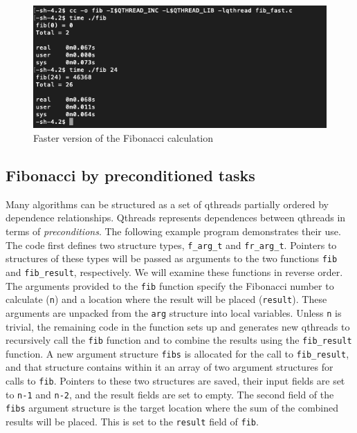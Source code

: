 \documentclass[12pt,fullpage]{article}
\begin{document}
\begin{figure}[h]
\includegraphics[scale=0.90]{fib_fast.png}
\caption{Faster version of the Fibonacci calculation}
\end{figure}

\newpage


\subsection{Fibonacci by preconditioned tasks}

Many algorithms can be structured as a set of qthreads partially ordered by dependence relationships.  Qthreads represents dependences between qthreads in terms of {\it preconditions}.  The following example program demonstrates their use.
\\

The code first defines two structure types, {\tt f\_arg\_t} and {\tt fr\_arg\_t}.  Pointers to structures of these types will be passed as arguments to the two functions {\tt fib} and {\tt fib\_result}, respectively.  We will examine these functions in reverse order.  The arguments provided to the {\tt fib} function specify the Fibonacci number to calculate ({\tt n}) and a location where the result will be placed ({\tt result}).   These arguments are unpacked from the {\tt arg} structure into local variables.  Unless {\tt n} is trivial, the remaining code in the function sets up and generates new qthreads to recursively call the {\tt fib} function and to combine the results using the {\tt fib\_result} function.  A new argument structure {\tt fibs} is allocated for the call to {\tt fib\_result}, and that structure contains within it an array of two argument structures for calls to {\tt fib}.  Pointers to these two structures are saved, their input fields are set to {\tt n-1} and {\tt n-2}, and the result fields are set to empty.  The second field of the {\tt fibs} argument structure is the target location where the sum of the combined results will be placed.  This is set to the {\tt result} field of {\tt fib}.
\end{document}
